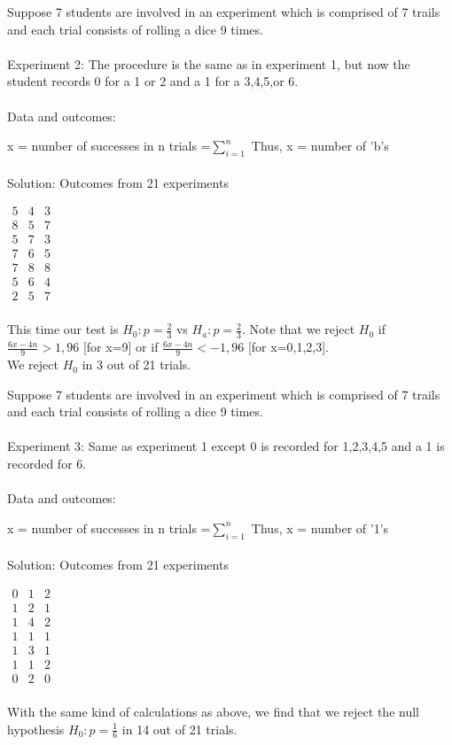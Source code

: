 \documentclass[12pt,a4paper]{article}
\theoremstyle{regla}
\theoremstyle{remark}
\theoremstyle{definition}
\theoremstyle{nonumberbreak}
\begin{document}
\begin{xmpl}
Suppose 7 students are involved in an experiment which is comprised of 7 trails and each trial consists of rolling a dice 9 times.\\
\\

Experiment 2: The procedure is the same as in experiment 1,  but now the student records 0 for a 1 or 2 and a 1 for a 3,4,5,or 6. \\\\

Data and outcomes: 

x = number of successes in n trials =$\sum_{i=1}^n$ 
Thus, x = number of 'b's\\\\

Solution:
Outcomes from 21 experiments


$\begin{matrix}
5 & 4 & 3\\
8 & 5 & 7\\
5 & 7 & 3\\ 
7 & 6 & 5\\ 
7 & 8 & 8\\ 
5 & 6 & 4\\ 
2 & 5 & 7 \\
\end{matrix}$

This time our test is $H_0:p=\frac{2}{3}$ vs $H_a:p=\frac{2}{3}$. Note that we reject $H_0$ if $\frac{6x-4n}{9}>1,96$ [for x=9] or if $\frac{6x-4n}{9}<-1,96$ [for x=0,1,2,3]. \\

We reject $H_0$ in 3 out of 21 trials.
\end{xmpl}
\begin{xmpl}
Suppose 7 students are involved in an experiment which is comprised of 7 trails and each trial consists of rolling a dice 9 times.\\
\\

Experiment 3: Same as experiment 1 except 0 is recorded for 1,2,3,4,5 and a 1 is recorded for 6. \\
\\
Data and outcomes: 

x = number of successes in n trials =$\sum_{i=1}^n$ 
Thus, x = number of '1's \\\\

Solution:
Outcomes from 21 experiments

$\begin{matrix}
0 & 1 & 2\\
1 & 2 & 1\\
1 & 4 & 2\\ 
1 & 1 & 1\\
1 & 3 & 1\\ 
1 & 1 & 2\\ 
0 & 2 & 0\\
\end{matrix}$

With the same kind of calculations as above, we find that we reject the null hypothesis $H_0:p=\frac{1}{6}$ in 14 out of 21 trials. 
\end{xmpl}
\end{document}
